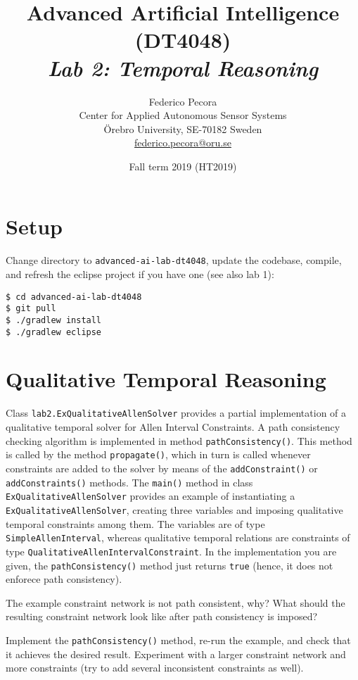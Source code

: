 \documentclass[a4paper]{article}
\title{Advanced Artificial Intelligence (DT4048)\\{\em Lab 2: Temporal Reasoning}}
\author{Federico Pecora\\Center for Applied Autonomous Sensor Systems\\\"Orebro University, SE-70182 Sweden\\\url{federico.pecora@oru.se}}
\date{Fall term 2019 (HT2019)}
\begin{document}
\maketitle

\section{Setup}

Change directory to {\tt advanced-ai-lab-dt4048}, update the codebase, compile, and refresh the eclipse project if you have one (see also lab 1):

\begin{lstlisting}
$ cd advanced-ai-lab-dt4048
$ git pull
$ ./gradlew install
$ ./gradlew eclipse
\end{lstlisting}

\section{Qualitative Temporal Reasoning}

Class {\tt lab2.ExQualitativeAllenSolver} provides a partial implementation of a qualitative temporal solver for Allen Interval Constraints.  A path consistency checking algorithm is implemented in method {\tt pathConsistency()}.  This method is called by the method {\tt propagate()}, which in turn is called whenever constraints are added to the solver by means of the {\tt addConstraint()} or {\tt addConstraints()} methods. The {\tt main()} method in class {\tt ExQualitativeAllenSolver} provides an example of instantiating a {\tt ExQualitativeAllenSolver}, creating three variables and imposing qualitative temporal constraints among them.  The variables are of type {\tt SimpleAllenInterval}, whereas qualitative temporal relations are constraints of type {\tt QualitativeAllenIntervalConstraint}.  In the implementation you are given, the {\tt pathConsistency()} method just returns {\tt true} (hence, it does not enforece path consistency).

{\ex{}\label{ex:ex1}  The example constraint network is not path consistent, why? What should the resulting constraint network look like after path consistency is imposed?\vspace{0.1cm}}

{\ex{}\label{ex:ex2} Implement the {\tt pathConsistency()} method, re-run the example, and check that it achieves the desired result.  Experiment with a larger constraint network and more constraints (try to add several inconsistent constraints as well). \vspace{0.1cm}}
\end{document}
